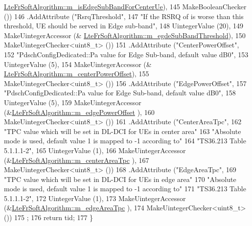 \begin{DoxyCode}
      \hyperlink{classns3_1_1LteFrSoftAlgorithm_ae11d5bba9caaedec48fed73a7d9e2ef6}{LteFrSoftAlgorithm::m\_isEdgeSubBandForCenterUe}),
145                    MakeBooleanChecker ())
146     .AddAttribute (\textcolor{stringliteral}{"RsrqThreshold"},
147                    \textcolor{stringliteral}{"If the RSRQ of is worse than this threshold, UE should be served in Edge sub-band"},
148                    UintegerValue (20),
149                    MakeUintegerAccessor (&
      \hyperlink{classns3_1_1LteFrSoftAlgorithm_ab06a0ac550999e2144a3169ad8879914}{LteFrSoftAlgorithm::m\_egdeSubBandThreshold}),
150                    MakeUintegerChecker<uint8\_t> ())
151     .AddAttribute (\textcolor{stringliteral}{"CenterPowerOffset"},
152                    \textcolor{stringliteral}{"PdschConfigDedicated::Pa value for Edge Sub-band, default value dB0"},
153                    UintegerValue (5),
154                    MakeUintegerAccessor (&
      \hyperlink{classns3_1_1LteFrSoftAlgorithm_a0218007e3441b896368aa4c733ac01fe}{LteFrSoftAlgorithm::m\_centerPowerOffset}),
155                    MakeUintegerChecker<uint8\_t> ())
156     .AddAttribute (\textcolor{stringliteral}{"EdgePowerOffset"},
157                    \textcolor{stringliteral}{"PdschConfigDedicated::Pa value for Edge Sub-band, default value dB0"},
158                    UintegerValue (5),
159                    MakeUintegerAccessor (&\hyperlink{classns3_1_1LteFrSoftAlgorithm_a7dcc64418f28e1120ce4572318138d14}{LteFrSoftAlgorithm::m\_edgePowerOffset}
      ),
160                    MakeUintegerChecker<uint8\_t> ())
161     .AddAttribute (\textcolor{stringliteral}{"CenterAreaTpc"},
162                    \textcolor{stringliteral}{"TPC value which will be set in DL-DCI for UEs in center area"}
163                    \textcolor{stringliteral}{"Absolute mode is used, default value 1 is mapped to -1 according to"}
164                    \textcolor{stringliteral}{"TS36.213 Table 5.1.1.1-2"},
165                    UintegerValue (1),
166                    MakeUintegerAccessor (&\hyperlink{classns3_1_1LteFrSoftAlgorithm_a5e508c0c0a988db791c4488f822c8aa4}{LteFrSoftAlgorithm::m\_centerAreaTpc}
      ),
167                    MakeUintegerChecker<uint8\_t> ())
168     .AddAttribute (\textcolor{stringliteral}{"EdgeAreaTpc"},
169                    \textcolor{stringliteral}{"TPC value which will be set in DL-DCI for UEs in edge area"}
170                    \textcolor{stringliteral}{"Absolute mode is used, default value 1 is mapped to -1 according to"}
171                    \textcolor{stringliteral}{"TS36.213 Table 5.1.1.1-2"},
172                    UintegerValue (1),
173                    MakeUintegerAccessor (&\hyperlink{classns3_1_1LteFrSoftAlgorithm_a10741f1e92877b05db224b19c79f4782}{LteFrSoftAlgorithm::m\_edgeAreaTpc}
      ),
174                    MakeUintegerChecker<uint8\_t> ())
175   ;
176   \textcolor{keywordflow}{return} tid;
177 \}
\end{DoxyCode}


